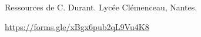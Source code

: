 \setcounter{exo}{0}
Ressources de C. Durant. Lycée Clémenceau, Nantes.
\begin{center}
\end{center}

\url{https://forms.gle/xBgx6pub2qL9Vu4K8}

